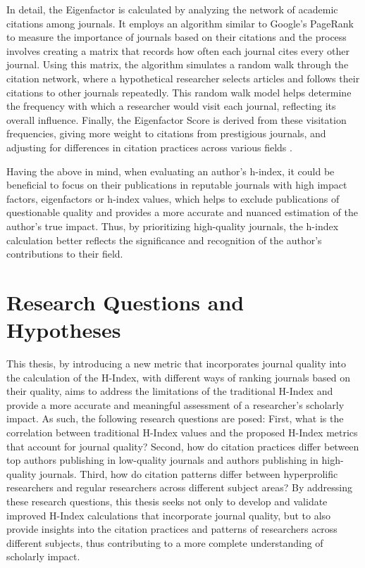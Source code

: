 In detail, the Eigenfactor is calculated by analyzing the network of academic
citations among journals. It employs an algorithm similar to Google's PageRank
to measure the importance of journals based on their citations and the process
involves creating a matrix that records how often each journal cites every
other journal. Using this matrix, the algorithm simulates a random walk through
the citation network, where a hypothetical researcher selects articles and
follows their citations to other journals repeatedly. This random walk model
helps determine the frequency with which a researcher would visit each journal,
reflecting its overall influence. Finally, the Eigenfactor Score is derived
from these visitation frequencies, giving more weight to citations from
prestigious journals, and adjusting for differences in citation practices
across various fields \cite{Bergstrom11433, Alan2009}.

Having the above in mind, when evaluating an author's h-index, it could be
beneficial to focus on their publications in reputable journals with high
impact factors, eigenfactors or h-index values, which helps to exclude
publications of questionable quality and provides a more accurate and nuanced
estimation of the author's true impact. Thus, by prioritizing high-quality
journals, the h-index calculation better reflects the significance and
recognition of the author's contributions to their field.

\section{Research Questions and Hypotheses}
This thesis, by introducing a new metric that incorporates journal quality into
the calculation of the H-Index, with different ways of ranking journals based
on their quality, aims to address the limitations of the traditional H-Index
and provide a more accurate and meaningful assessment of a researcher's
scholarly impact. As such, the following research questions are posed: First,
what is the correlation between traditional H-Index values and the proposed
H-Index metrics that account for journal quality? Second, how do citation
practices differ between top authors publishing in low-quality journals and
authors publishing in high-quality journals. Third, how do citation patterns
differ between hyperprolific researchers and regular researchers across
different subject areas? By addressing these research questions, this thesis
seeks not only to develop and validate improved H-Index calculations that
incorporate journal quality, but to also provide insights into the citation
practices and patterns of researchers across different subjects, thus
contributing to a more complete understanding of scholarly impact.
